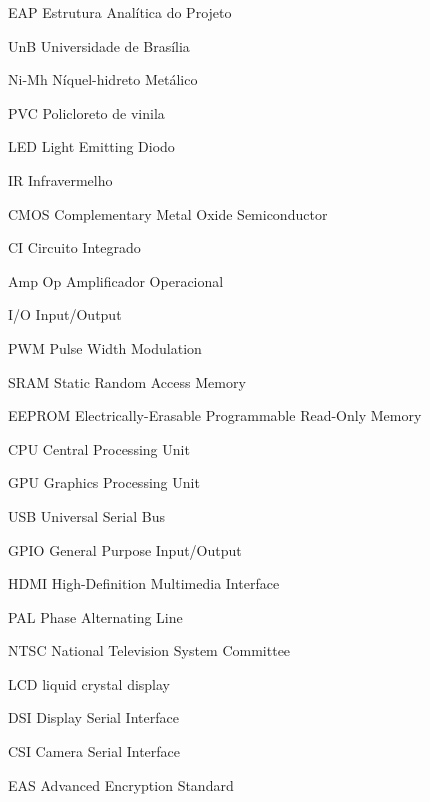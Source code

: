 \begin{siglas}
\item [EAP ] Estrutura Analítica do Projeto
\item [UnB ] Universidade de Brasília
\item [Ni-Mh ] Níquel-hidreto Metálico
\item [PVC ] Policloreto de vinila 
\item [LED ] Light Emitting Diodo
\item [IR ] Infravermelho
\item [CMOS ] Complementary Metal Oxide Semiconductor
\item [CI ] Circuito Integrado
\item [Amp Op ] Amplificador Operacional
\item [I/O ] Input/Output
\item [PWM ] Pulse Width Modulation
\item [SRAM ] Static Random Access Memory
\item [EEPROM ] Electrically-Erasable Programmable Read-Only Memory
\item [CPU ] Central Processing Unit
\item [GPU ] Graphics Processing Unit
\item [USB ] Universal Serial Bus
\item [GPIO ] General Purpose Input/Output
\item [HDMI ] High-Definition Multimedia Interface
\item [PAL ] Phase Alternating Line
\item [NTSC ] National Television System Committee
\item [LCD ] liquid crystal display
\item [DSI ] Display Serial Interface
\item [CSI ] Camera Serial Interface
\item [EAS ] Advanced Encryption Standard
\end{siglas}
